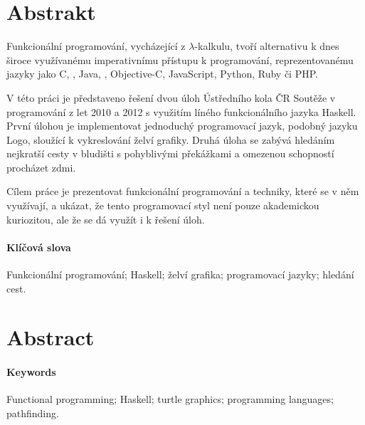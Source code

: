 \begin{adjustwidth}{1.5cm}{1.5cm}


\section*{Abstrakt}

Funkcionální programování, vycházející z $\lambda$-kalkulu, tvoří alternativu k
dnes široce využívanému imperativnímu přístupu k programování, reprezentovanému
jazyky jako C, \Cplusplus{}, Java, \Csh{}, Objective-C, JavaScript, Python, Ruby
či PHP.

V této práci je představeno řešení dvou úloh Ústředního kola ČR Soutěže v
programování z let 2010 a 2012 s využitím líného funkcionálního jazyka Haskell.
První úlohou je implementovat jednoduchý programovací jazyk, podobný jazyku
Logo, sloužící k vykreslování želví grafiky. Druhá úloha se zabývá hledáním
nejkratší cesty v bludišti s pohyblivými překážkami a omezenou schopností
procházet zdmi.

Cílem práce je prezentovat funkcionální programování a techniky, které se v něm
využívají, a ukázat, že tento programovací styl není pouze akademickou
kuriozitou, ale že se dá využít i k řešení  úloh.

\paragraph*{Klíčová slova}
Funkcionální programování; Haskell; želví grafika; programovací jazyky; hledání
cest.

\section*{Abstract}

\paragraph*{Keywords}
Functional programming; Haskell; turtle graphics; programming languages;
pathfinding.

\end{adjustwidth}
